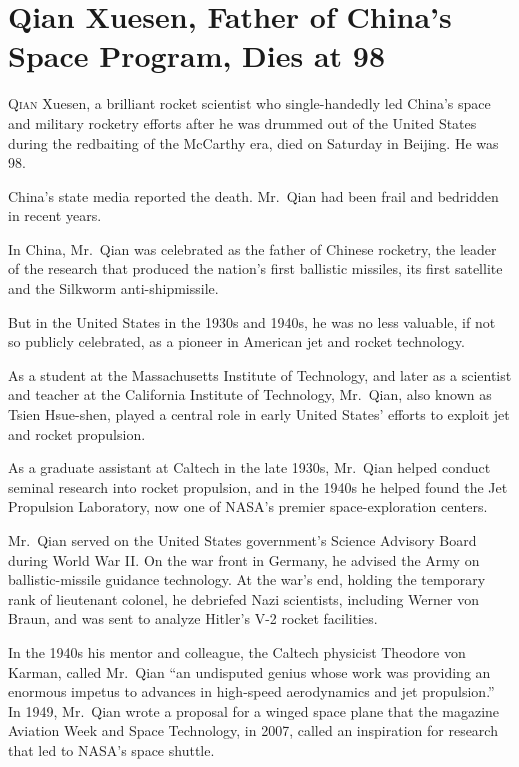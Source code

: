 ﻿\documentclass[12pt]{article}
\begin{document}
\section{Qian Xuesen, Father of China's Space Program, Dies at 98}

\lettrine{Q}{ian} Xuesen, a brilliant rocket scientist who single-handedly
led China's space and military rocketry efforts after he was drummed out of the United States during
the redbaiting of the McCarthy era, died on Saturday in Beijing. He was 98.

China's state media reported the death. Mr.~Qian had been frail and bedridden in recent years.

In China, Mr.~Qian was celebrated as the father of Chinese rocketry, the leader of the research that
produced the nation's first ballistic missiles, its first satellite and the Silkworm
anti-shipmissile.

But in the United States in the 1930s and 1940s, he was no less valuable, if not so publicly
celebrated, as a pioneer in American jet and rocket technology.

As a student at the Massachusetts Institute of Technology, and later as a scientist and teacher at
the California Institute of Technology, Mr.~Qian, also known as Tsien Hsue-shen, played a central
role in early United States' efforts to exploit jet and rocket propulsion.

As a graduate assistant at Caltech in the late 1930s, Mr.~Qian helped conduct seminal research into
rocket propulsion, and in the 1940s he helped found the Jet Propulsion Laboratory, now one of NASA's
premier space-exploration centers.

Mr.~Qian served on the United States government's Science Advisory Board during World War II. On the
war front in Germany, he advised the Army on ballistic-missile guidance technology. At the war's
end, holding the temporary rank of lieutenant colonel, he debriefed Nazi scientists, including
Werner von Braun, and was sent to analyze Hitler's V-2 rocket facilities.

In the 1940s his mentor and colleague, the Caltech physicist Theodore von Karman, called Mr.~Qian
``an undisputed genius whose work was providing an enormous impetus to advances in high-speed
aerodynamics and jet propulsion.'' In 1949, Mr.~Qian wrote a proposal for a winged space plane that
the magazine Aviation Week and Space Technology, in 2007, called an inspiration for research that
led to NASA's space shuttle.
\end{document}

